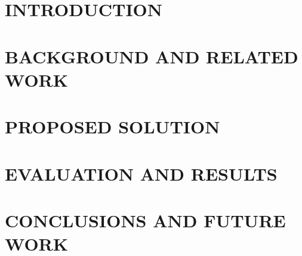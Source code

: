 \renewcommand*{\acronymname}{LIST OF ABBREVIATIONS}
\renewcommand*{\entryname}{Abbreviation}
\renewcommand*{\descriptionname}{Definition}
\glsaddall
\printnoidxglossary[type=\acronymtype, title={LIST OF ABBREVIATIONS}, nonumberlist]
\clearpage

\renewcommand\appendixname{APPENDIX}
\renewcommand\appendixpagename{APPENDIX}
\renewcommand\appendixtocname{APPENDIX}
\renewcommand{\figurename}{Figure}
\renewcommand{\tablename}{Table}
\renewcommand{\chaptername}{CHAPTER}

\pagestyle{fancy}
\fancyhf{}
\fancyhead[RE, LO]{\leftmark}
\fancyfoot[RE, LO]{\thepage}

\chapter{INTRODUCTION}

\newpage
\chapter{BACKGROUND AND RELATED WORK}


\newpage
\chapter{PROPOSED SOLUTION}


\newpage
\chapter{EVALUATION AND RESULTS}


\newpage
\chapter{CONCLUSIONS AND FUTURE WORK}


\newpage
\renewcommand\bibname{REFERENCE}
\printbibliography
{}


